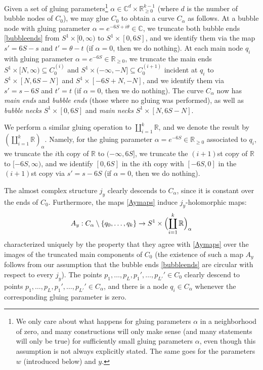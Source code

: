 \documentclass[12pt]{article}
\theoremstyle{definition}
\theoremstyle{remark}
\numberwithin{equation}{subsection}
\newcommand{\CC}{\mathbb C}
\newcommand{\RR}{\mathbb R}
\begin{document}
Given a set of gluing parameters\footnote{We only care about what happens for gluing parameters $\alpha$ in a neighborhood of zero, and many constructions will only make sense (and many statements will only be true) for sufficiently small gluing parameters $\alpha$, even though this assumption is not always explicitly stated.  The same goes for the parameters $w$ (introduced below) and $y$.} $\alpha\in\CC^d\times\RR_{\geq 0}^{k-1}$ (where $d$ is the number of bubble nodes of $C_0$), we may glue $C_0$ to obtain a curve $C_\alpha$ as follows.  At a bubble node with gluing parameter $\alpha=e^{-6S+i\theta}\in\CC$, we truncate both bubble ends \eqref{bubbleends} from $S^1\times[0,\infty)$ to $S^1\times[0,6S]$, and we identify them via the map $s'=6S-s$ and $t'=\theta-t$ (if $\alpha=0$, then we do nothing).  At each main node $q_i$ with gluing parameter $\alpha=e^{-6S}\in\RR_{\geq 0}$, we truncate the main ends $S^1\times[N,\infty)\subseteq C_0^{(i)}$ and $S^1\times(-\infty,-N]\subseteq C_0^{(i+1)}$ incident at $q_i$ to $S^1\times[N,6S-N]$ and $S^1\times[-6S+N,-N]$, and we identify them via $s'=s-6S$ and $t'=t$ (if $\alpha=0$, then we do nothing).  The curve $C_\alpha$ now has \emph{main ends} and \emph{bubble ends} (those where no gluing was performed), as well as \emph{bubble necks} $S^1\times[0,6S]$ and \emph{main necks} $S^1\times[N,6S-N]$.

We perform a similar gluing operation to $\coprod_{i=1}^k\RR$, and we denote the result by $(\coprod_{i=1}^k\RR)_\alpha$.  Namely, for the gluing parameter $\alpha=e^{-6S}\in\RR_{\geq 0}$ associated to $q_i$, we truncate the $i$th copy of $\RR$ to $(-\infty,6S]$, we truncate the $(i+1)$st copy of $\RR$ to $[-6S,\infty)$, and we identify $[0,6S]$ in the $i$th copy with $[-6S,0]$ in the $(i+1)$st copy via $s'=s-6S$ (if $\alpha=0$, then we do nothing).

The almost complex structure $j_y$ clearly descends to $C_\alpha$, since it is constant over the ends of $C_0$.  Furthermore, the maps \eqref{Aymaps} induce $j_y$-holomorphic maps:
\begin{equation}
A_y:C_\alpha\setminus\{q_0,\ldots,q_k\}\to S^1\times\Bigl(\coprod_{i=1}^k\RR\Bigr)_\alpha
\end{equation}
characterized uniquely by the property that they agree with \eqref{Aymaps} over the images of the truncated main components of $C_0$ (the existence of such a map $A_y$ follows from our assumption that the bubble ends \eqref{bubbleends} are circular with respect to every $j_y$).  The points $p_1,\ldots,p_L,p_1',\ldots,p_{L'}'\in C_0$ clearly descend to points $p_1,\ldots,p_L,p_1',\ldots,p_{L'}'\in C_\alpha$, and there is a node $q_i\in C_\alpha$ whenever the corresponding gluing parameter is zero.
\end{document}
